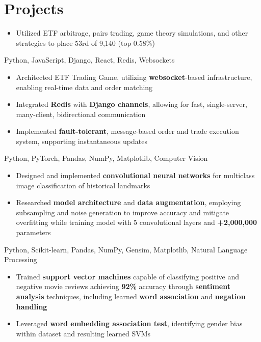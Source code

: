 \documentclass[letterpaper,11pt]{article}
\begin{document}
\section{Projects}
\begin{itemize}
    \item Utilized ETF arbitrage, pairs trading, game theory simulations, and
          other strategies to place 53rd of 9,140 (top 0.58\%)
\end{itemize}
{Python, JavaScript, Django, React, Redis, Websockets}{}
\begin{itemize}
    \item Architected ETF Trading Game, utilizing \textbf{websocket}-based
          infrastructure, enabling real-time data and order matching
    \item Integrated \textbf{Redis} with \textbf{Django channels},
          allowing for fast, single-server, many-client, bidirectional
          communication
    \item Implemented \textbf{fault-tolerant}, message-based order
          and trade execution system, supporting instantaneous updates
\end{itemize}
{Python, PyTorch, Pandas, NumPy, Matplotlib, Computer Vision}{}
\begin{itemize}
    \item Designed and implemented \textbf{convolutional neural networks} for multiclass
          image classification of historical landmarks
    \item Researched \textbf{model architecture} and \textbf{data augmentation},
          employing subsampling and noise generation to improve accuracy and mitigate
          overfitting while training model with 5 convolutional layers and
          \textbf{+2,000,000} parameters
\end{itemize}
{Python, Scikit-learn, Pandas, NumPy, Gensim, Matplotlib, Natural Language Processing}{}
\begin{itemize}
    \item Trained \textbf{support vector machines} capable of classifying positive and
          negative movie reviews achieving \textbf{92\%} accuracy through
          \textbf{sentiment analysis} techniques, including learned \textbf{word
              association} and \textbf{negation handling}
    \item Leveraged \textbf{word embedding association test}, identifying
          gender bias within dataset and resulting learned SVMs
\end{itemize}
\end{document}
